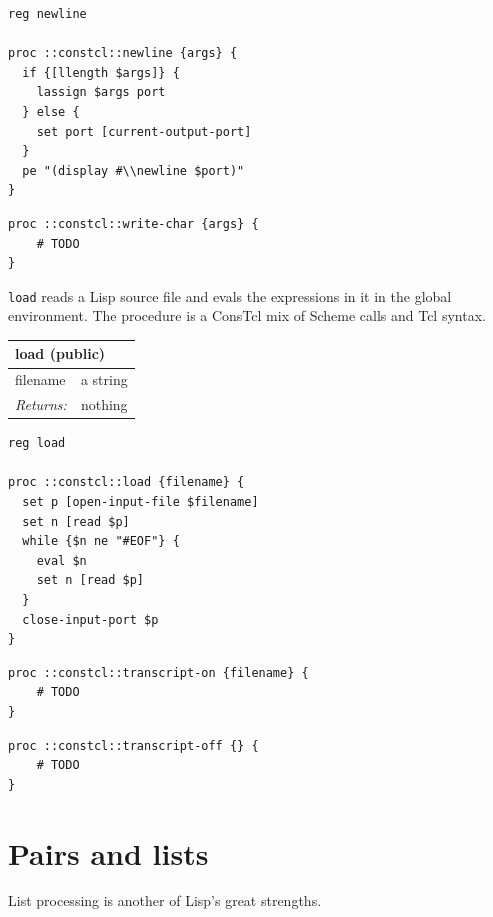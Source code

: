 \documentclass[twoside,9pt]{report}
\begin{document}
\noindent\makebox[\linewidth]{\rule{\linewidth}{0.4pt}}
\begin{lstlisting}
reg newline
 
proc ::constcl::newline {args} {
  if {[llength $args]} {
    lassign $args port
  } else {
    set port [current-output-port]
  }
  pe "(display #\\newline $port)"
}
\end{lstlisting}
\noindent\makebox[\linewidth]{\rule{\linewidth}{0.4pt}}
\noindent\makebox[\linewidth]{\rule{\linewidth}{0.4pt}}
\begin{lstlisting}
proc ::constcl::write-char {args} {
    # TODO
}
\end{lstlisting}
\noindent\makebox[\linewidth]{\rule{\linewidth}{0.4pt}}

\texttt{load} reads a Lisp source file and evals the expressions in it in the global environment. The procedure is a ConsTcl mix of Scheme calls and Tcl syntax.

\begin{tabular}{ |l l| }
\hline
\multicolumn{2}{|l|}{load (public)} \\
\hline
filename & a string \\
\textit{Returns:} & nothing \\
\hline
\end{tabular}

\noindent\makebox[\linewidth]{\rule{\linewidth}{0.4pt}}
\begin{lstlisting}
reg load
 
proc ::constcl::load {filename} {
  set p [open-input-file $filename]
  set n [read $p]
  while {$n ne "#EOF"} {
    eval $n
    set n [read $p]
  }
  close-input-port $p
}
\end{lstlisting}
\noindent\makebox[\linewidth]{\rule{\linewidth}{0.4pt}}
\noindent\makebox[\linewidth]{\rule{\linewidth}{0.4pt}}
\begin{lstlisting}
proc ::constcl::transcript-on {filename} {
    # TODO
}
\end{lstlisting}
\noindent\makebox[\linewidth]{\rule{\linewidth}{0.4pt}}
\noindent\makebox[\linewidth]{\rule{\linewidth}{0.4pt}}
\begin{lstlisting}
proc ::constcl::transcript-off {} {
    # TODO
}
\end{lstlisting}
\noindent\makebox[\linewidth]{\rule{\linewidth}{0.4pt}}
\section{Pairs and lists}
\label{pairs-and-lists}

List processing is another of Lisp's great strengths.
\end{document}
